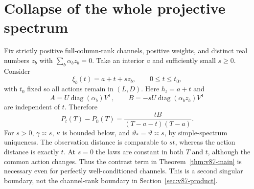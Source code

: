 \documentclass[11pt,reqno]{amsart}
\numberwithin{equation}{section}
\theoremstyle{definition}\newtheorem{definition}[theorem]{Definition}
\theoremstyle{remark}\newtheorem{remark}[theorem]{Remark}
\newcommand{\diag}{\operatorname{diag}}
\newcommand{\sig}{\vartheta}
\begin{document}
\section{Collapse of the whole projective spectrum}
\label{sec:v87-collapse}
Fix strictly positive full-column-rank channels, positive weights, and
distinct real numbers $z_b$ with $\sum_b\alpha_bz_b=0$.
Take an interior $a$ and sufficiently small $s\ge0$. Consider
\begin{equation}\label{eq:v87-collapse}
             \xi_b(t)=a+t+s z_b,\qquad 0\le t\le t_0,
\end{equation}
with $t_0$ fixed so all actions remain in $(L,D)$.
Here $h_t=a+t$ and
\[
 A=U\diag(\alpha_b)V^{\mathsf T},\qquad
 B=-sU\diag(\alpha_bz_b)V^{\mathsf T}
\]
are independent of $t$. Therefore
\begin{equation}\label{eq:v87-collapse-identity}
 P_t(T)-P_0(T)
       =\frac{tB}{(T-a-t)(T-a)}.
\end{equation}
For $s>0$, $\gamma\asymp s$, $\kappa$ is bounded below, and
$\sig_* = \sig\asymp s$, by simple-spectrum uniqueness. The
observation distance is comparable to $st$, whereas the action
distance is exactly $t$. At $s=0$ the laws are constant in both
$T$ and $t$, although the common action changes. Thus the contrast
term in Theorem~\ref{thm:v87-main} is necessary even for perfectly
well-conditioned channels. This is a second singular boundary, not
the channel-rank boundary in Section~\ref{sec:v87-product}.
\end{document}
